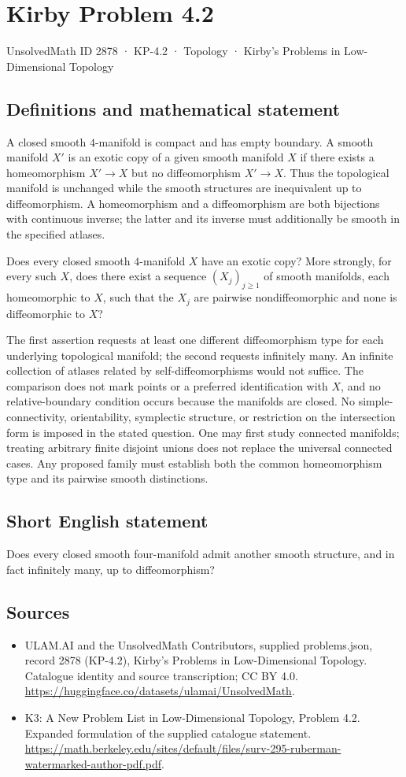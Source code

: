 \documentclass[11pt,a4paper]{article}
\begin{document}
\section*{Kirby Problem 4.2}\label{2878}
{\small UnsolvedMath ID 2878 · KP-4.2 · Topology · Kirby's Problems in Low-Dimensional Topology}
\subsection{Definitions and mathematical statement}
A closed smooth $4$-manifold is compact and has empty boundary.
A smooth manifold $X'$ is an exotic copy of a given smooth manifold
$X$ if there exists a homeomorphism $X'\to X$ but no diffeomorphism
$X'\to X$. Thus the topological manifold is unchanged while the smooth
structures are inequivalent up to diffeomorphism. A homeomorphism and
a diffeomorphism are both bijections with continuous inverse; the latter
and its inverse must additionally be smooth in the specified atlases.

Does every closed smooth $4$-manifold $X$ have an exotic copy? More
strongly, for every such $X$, does there exist a sequence
$(X_j)_{j\ge1}$ of smooth manifolds, each homeomorphic to $X$, such
that the $X_j$ are pairwise nondiffeomorphic and none is diffeomorphic
to $X$?

The first assertion requests at least one different diffeomorphism
type for each underlying topological manifold; the second requests
infinitely many. An infinite collection of atlases related by
self-diffeomorphisms would not suffice. The comparison does not mark
points or a preferred identification with $X$, and no relative-boundary
condition occurs because the manifolds are closed.
No simple-connectivity, orientability, symplectic structure, or restriction
on the intersection form is imposed in the stated question. One may
first study connected manifolds; treating arbitrary finite disjoint
unions does not replace the universal connected cases. Any proposed
family must establish both the common homeomorphism type and its
pairwise smooth distinctions.
\subsection{Short English statement}
Does every closed smooth four-manifold admit another smooth structure, and in fact infinitely many, up to diffeomorphism?
\subsection{Sources}
\begin{itemize}
\item[S1] ULAM.AI and the UnsolvedMath Contributors, supplied problems.json, record 2878 (KP-4.2), Kirby's Problems in Low-Dimensional Topology. Catalogue identity and source transcription; CC BY 4.0.
\url{https://huggingface.co/datasets/ulamai/UnsolvedMath}.
\item[S2] K3: A New Problem List in Low-Dimensional Topology, Problem 4.2. Expanded formulation of the supplied catalogue statement.
\url{https://math.berkeley.edu/sites/default/files/surv-295-ruberman-watermarked-author-pdf.pdf}.
\end{itemize}
\end{document}
